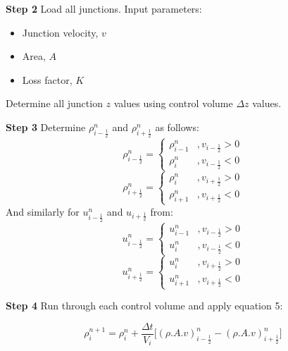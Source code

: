 \documentclass[11pt,letterpaper,titlepage]{article}
\newcommand{\half}{\frac{1}{2}}
\begin{document}
\vspace{0.5cm}\noindent
\textbf{Step 2}\newline
Load all junctions. Input parameters:
\begin{itemize}
\item Junction velocity, $v$
\item Area, $A$
\item Loss factor, $K$
\end{itemize}

\noindent Determine all junction $z$ values using control volume $\Delta z$ values.




\vspace{0.5cm}\noindent
\textbf{Step 3}\newline
Determine $\rho_{i-\half}^n$ and $\rho_{i+\half}^n$ as follows:
\begin{equation*}
\rho_{i-\half}^n=
\begin{cases}
\rho_{i-1}^n     &,v_{i-\half}>0 \\
\rho_{i}^n    &,v_{i-\half}<0
\end{cases}
\end{equation*}
\begin{equation*}
\rho_{i+\half}^n=
\begin{cases}
\rho_{i}^n     &,v_{i+\half}>0 \\
\rho_{i+1}^n    &,v_{i+\half}<0
\end{cases}
\end{equation*}
And similarly for $u_{i-\half}^n$ and $u_{i+\half}$ from:
\begin{equation*}
u_{i-\half}^n=
\begin{cases}
u_{i-1}^n     &,v_{i-\half}>0 \\
u_{i}^n    &,v_{i-\half}<0
\end{cases}
\end{equation*}
\begin{equation*}
u_{i+\half}^n=
\begin{cases}
u_{i}^n     &,v_{i+\half}>0 \\
u_{i+1}^n    &,v_{i+\half}<0
\end{cases}
\end{equation*}



\vspace{0.5cm}\noindent
\textbf{Step 4}\newline
Run through each control volume and apply equation 5:

\begin{equation*}
\rho_i^{n+1}  = \rho_i^{n}+\frac{\Delta t}{V_i}\biggr[ (\rho.A.v)_{i-\half}^{n}-(\rho.A.v)_{i+\half}^{n} \biggr]
\end{equation*}
\end{document}
